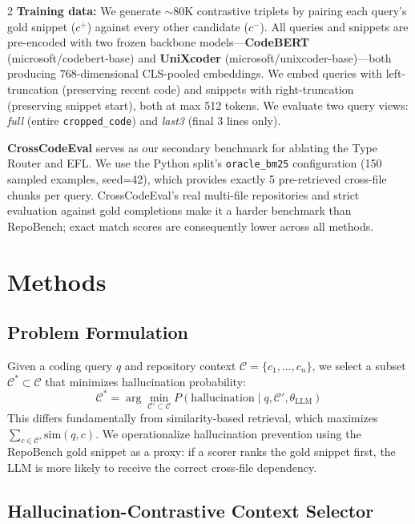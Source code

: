 \documentclass[11pt,a4paper]{article}
\begin{document}
\begin{multicols}{2}
\textbf{Training data:} We generate $\sim$80K contrastive triplets by pairing each query's gold snippet ($c^+$) against every other candidate ($c^-$). All queries and snippets are pre-encoded with two frozen backbone models---\textbf{CodeBERT} (microsoft/codebert-base) and \textbf{UniXcoder} (microsoft/unixcoder-base)---both producing 768-dimensional CLS-pooled embeddings. We embed queries with left-truncation (preserving recent code) and snippets with right-truncation (preserving snippet start), both at max 512 tokens. We evaluate two query views: \textit{full} (entire \texttt{cropped\_code}) and \textit{last3} (final 3 lines only).

\textbf{CrossCodeEval} \citep{ding2023crosscodeeval} serves as our secondary benchmark for ablating the Type Router and EFL. We use the Python split's \texttt{oracle\_bm25} configuration (150 sampled examples, seed=42), which provides exactly 5 pre-retrieved cross-file chunks per query. CrossCodeEval's real multi-file repositories and strict evaluation against gold completions make it a harder benchmark than RepoBench; exact match scores are consequently lower across all methods.

\section{Methods}

\subsection{Problem Formulation}

Given a coding query $q$ and repository context $\mathcal{C} = \{c_1, \ldots, c_n\}$, we select a subset $\mathcal{C}^* \subset \mathcal{C}$ that minimizes hallucination probability:
\begin{equation}
\mathcal{C}^* = \arg\min_{\mathcal{C}' \subset \mathcal{C}} P(\text{hallucination} \mid q, \mathcal{C}', \theta_{\text{LLM}})
\end{equation}
This differs fundamentally from similarity-based retrieval, which maximizes $\sum_{c \in \mathcal{C}'} \text{sim}(q, c)$. We operationalize hallucination prevention using the RepoBench gold snippet as a proxy: if a scorer ranks the gold snippet first, the LLM is more likely to receive the correct cross-file dependency.

\subsection{Hallucination-Contrastive Context Selector}


\end{multicols}
\end{document}
